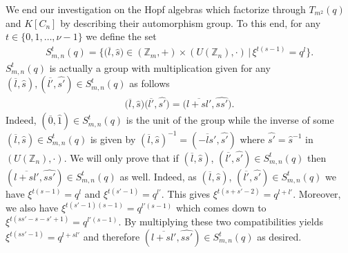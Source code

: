 \documentclass[10pt,a4paper]{amsart}
\numberwithin{equation}{section}
\begin{document}
We end our investigation on the Hopf algebras which factorize through $T_{m^{2}}(q)$ and $K[C_n]$ by describing their automorphism group. To this end, for any $t \in \{0, 1,\dots, \nu - 1\}$ we define the set
\begin{gather*}
S^{t}_{m, n}(q) = \big\{\big(\overline{l}, \widehat{s}\big) \in (\mathbb{Z}_{m}, +) \times (U(\mathbb{Z}_{n}), \cdot) \,|\, \xi^{t(s-1)} = q^{l}\big\}.
\end{gather*}
$S^{t}_{m, n}(q)$ is actually a group with multiplication given for any $(\overline{l}, \widehat{s}), (\overline{l'},\widehat{s'}) \in S^{t}_{m, n}(q)$ as follows
\begin{gather*}
\big(\overline{l}, \widehat{s}\big)\big(\overline{l'}, \widehat{s'}\big) = \big(\overline{l+sl'}, \widehat{ss'}\big).
\end{gather*}
Indeed, $(\overline{0}, \widehat{1}) \in S^{t}_{m, n}(q)$ is the unit of the group while the inverse of some $(\overline{l}, \widehat{s}) \in S^{t}_{m, n}(q)$ is given by $(\overline{l}, \widehat{s})^{-1} = (\overline{-ls'}, \widehat{s'})$ where $\widehat{s'} =\widehat{s}^{-1}$ in $(U(\mathbb{Z}_{n}), \cdot)$. We will only prove that if $(\overline{l}, \widehat{s})$, $(\overline{l'},\widehat{s'}) \in S^{t}_{m, n}(q)$ then $(\overline{l+sl'}, \widehat{ss'}) \in S^{t}_{m, n}(q)$ as well. Indeed, as $(\overline{l}, \widehat{s})$, $(\overline{l'}, \widehat{s'})
\in S^{t}_{m, n}(q)$ we have $\xi^{t(s-1)} = q^{l}$ and $\xi^{t(s'-1)} = q^{l'}$. This gives $\xi^{t(s+s'-2)} = q^{l+l'}$. Moreover, we also have $\xi^{t(s'-1)(s-1)} = q^{l'(s-1)}$ which comes down to $\xi^{t(ss'- s - s' + 1)} = q^{l'(s-1)}$. By multiplying these two compatibilities yields $\xi^{t(ss'-1)} = q^{l+sl'}$ and therefore $(\overline{l+sl'}, \widehat{ss'}) \in S^{t}_{m, n}(q)$ as desired.
\end{document}
